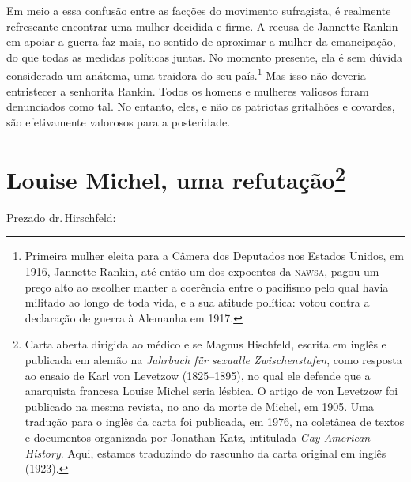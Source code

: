 Em meio a essa confusão entre as facções do movimento sufragista, é
realmente refrescante encontrar uma mulher decidida e firme. A recusa de
Jannette Rankin em apoiar a guerra faz mais, no sentido de aproximar a
mulher da emancipação, do que todas as medidas políticas juntas. No
momento presente, ela é sem dúvida considerada um anátema, uma traidora
do seu país.\footnote{Primeira mulher eleita para a Câmera dos Deputados
  nos Estados Unidos, em 1916, Jannette Rankin, até então um dos
  expoentes da \textsc{nawsa}, pagou um preço alto ao escolher manter a coerência
  entre o pacifismo pelo qual havia militado ao longo de toda vida, e a
  sua atitude política: votou contra a declaração de guerra à Alemanha
  em 1917.} Mas isso não deveria entristecer a senhorita Rankin. Todos
os homens e mulheres valiosos foram denunciados como tal. No entanto,
eles, e não os patriotas gritalhões e covardes, são efetivamente valorosos
para a posteridade.

\chapter{Louise Michel, uma refutação\footnote[*]{Carta aberta dirigida ao médico e
  se Magnus Hischfeld, escrita em inglês e publicada em alemão na
  \emph{Jahrbuch für sexualle Zwischenstufen}, como resposta ao ensaio
  de Karl von Levetzow (1825--1895), no qual ele defende que a anarquista francesa
  Louise Michel seria lésbica. O artigo de von Levetzow foi publicado na
  mesma revista, no ano da morte de Michel, em 1905. Uma tradução para o
  inglês da carta foi publicada, em 1976, na coletânea de textos e
  documentos organizada por Jonathan Katz, intitulada \emph{Gay American
  History}. Aqui, estamos traduzindo do rascunho da carta original em
  inglês (1923).}}


Prezado dr.\,Hirschfeld:

